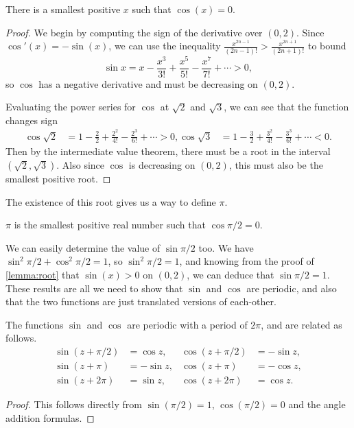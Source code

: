 \begin{lemma}\label{lemma:root}
	There is a smallest positive $x$ such that $\cos(x) = 0$.
\end{lemma}
\begin{proof}
	We begin by computing the sign of the derivative over $(0, 2)$.
	Since $\cos'(x) = -\sin(x)$, we can use the inequality $\frac{x^{2n - 1}}{(2n - 1)!} > \frac{x^{2n + 1}}{(2n + 1)!}$ to bound
	$$
	\sin x = x - \frac{x^3}{3!} + \frac{x^5}{5!} - \frac{x^7}{7!} + \cdots > 0,
	$$
	so $\cos$ has a negative derivative and must be decreasing on $(0, 2)$.


	Evaluating the power series for $\cos$ at $\sqrt{2}$ and $\sqrt{3}$, we can see that the function changes sign
\begin{align*}
	\cos \sqrt{2} &= 1 - \frac{2}{2} + \frac{2^2}{4!} - \frac{2^3}{6!} +  \cdots > 0, 
	\cos \sqrt{3} &= 1 - \frac{3}{2} + \frac{3^2}{4!} - \frac{3^3}{6!} + \cdots < 0.
\end{align*}
Then by the intermediate value theorem, there must be a root in the interval $(\sqrt{2}, \sqrt{3})$. Also since $\cos$ is decreasing on $(0, 2)$, this must also be the smallest positive root.
\end{proof}

The existence of this root gives us a way to define $\pi$.

\begin{definition}[$\pi$]
	 $\pi$ is the smallest positive real number such that $\cos \pi/2 = 0$.
\end{definition}

We can easily determine the value of $\sin \pi/2$ too. We have $\sin^2 \pi/2 + \cos^2 \pi/2 = 1$, so $\sin^2 \pi/2 = 1$, and 
knowing from the proof of \autoref{lemma:root} that $\sin(x) > 0$ on $(0, 2)$, we can deduce that $\sin \pi/2 = 1$. These results are all we need to show that $\sin$ and $\cos$ are periodic, and also that the two functions are just translated versions of each-other.

\begin{proposition}
	The functions $\sin$ and $\cos$ are periodic with a period of $2 \pi$, and are related as follows.
	\begin{align*}
			\sin (z+ \pi/2)& =\cos z,   & \cos (z+ \pi/2)&=-\sin z, \\
			\sin (z+\pi)&=-\sin z, & \cos (z+\pi)&=-\cos z, \\
			\sin (z+2 \pi)&=\sin z, & \cos (z+2 \pi)&=\cos z.
	\end{align*}
\end{proposition}
\begin{proof}
	This follows directly from $\sin(\pi/2) = 1$, $\cos(\pi/2) = 0$ and the angle addition formulas.
\end{proof}

